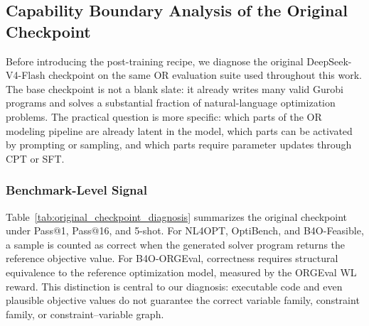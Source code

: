 

\subsection{Capability Boundary Analysis of the Original Checkpoint}
\label{subsec:original_checkpoint_diagnosis}

Before introducing the post-training recipe, we diagnose the original
DeepSeek-V4-Flash checkpoint on the same OR evaluation suite used throughout
this work. The base checkpoint is not a blank slate: it already writes many
valid Gurobi programs and solves a substantial fraction of natural-language
optimization problems. The practical question is more specific: which parts of
the OR modeling pipeline are already latent in the model, which parts can be
activated by prompting or sampling, and which parts require parameter updates
through CPT or SFT.

\subsubsection{Benchmark-Level Signal}

Table~\ref{tab:original_checkpoint_diagnosis} summarizes the original
checkpoint under Pass@1, Pass@16, and 5-shot. For NL4OPT, OptiBench, and
B4O-Feasible, a sample is
counted as correct when the generated solver program returns the reference objective
value. For B4O-ORGEval, correctness requires structural equivalence to the
reference optimization model, measured by the ORGEval WL reward. This
distinction is central to our diagnosis: executable code and even plausible
objective values do not guarantee the correct variable family, constraint
family, or constraint--variable graph.

